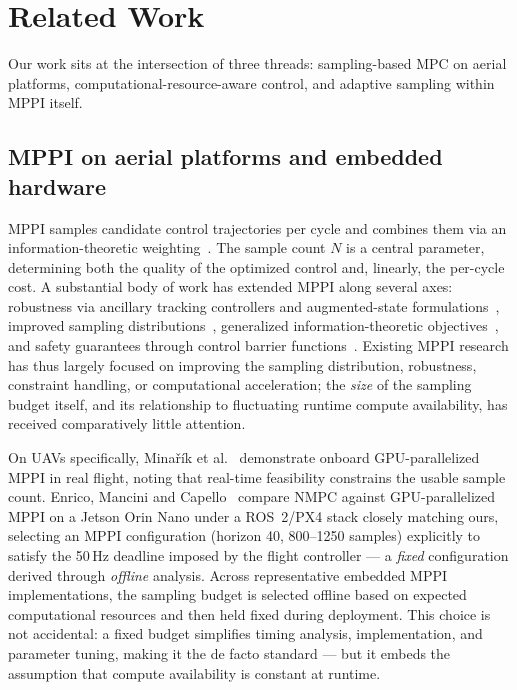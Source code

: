 \documentclass[conference]{IEEEtran}
\begin{document}
\section{Related Work}
\label{sec:related}

Our work sits at the intersection of three threads: sampling-based MPC on
aerial platforms, computational-resource-aware control, and adaptive
sampling within MPPI itself.

\subsection{MPPI on aerial platforms and embedded hardware}

MPPI samples candidate control trajectories per cycle and combines them
via an information-theoretic
weighting~\cite{williams2016aggressive,williams2018information}. The
sample count $N$ is a central parameter, determining both the quality of
the optimized control and, linearly, the per-cycle cost. A substantial
body of work has extended MPPI along several axes: robustness via
ancillary tracking controllers and augmented-state
formulations~\cite{williams2018robust,gandhi2021robust}, improved
sampling distributions~\cite{mohamed2022logmppi}, generalized
information-theoretic objectives~\cite{wang2021tsallis}, and safety
guarantees through control barrier functions~\cite{yin2023shield}.
Existing MPPI research has thus largely focused on improving the sampling
distribution, robustness, constraint handling, or computational
acceleration; the \emph{size} of the sampling budget itself, and its
relationship to fluctuating runtime compute availability, has received
comparatively little attention.

On UAVs specifically, Mina\v{r}\'ik et al.~\cite{minarik2024mppi}
demonstrate onboard GPU-parallelized MPPI in real flight, noting that
real-time feasibility constrains the usable sample count. Enrico, Mancini
and Capello~\cite{enrico2025comparison} compare NMPC against
GPU-parallelized MPPI on a Jetson Orin Nano under a ROS~2/PX4 stack
closely matching ours, selecting an MPPI configuration (horizon 40,
800--1250 samples) explicitly to satisfy the 50\,Hz deadline imposed by
the flight controller --- a \emph{fixed} configuration derived through
\emph{offline} analysis. Across representative embedded MPPI
implementations, the sampling budget is selected offline based on
expected computational resources and then held fixed during deployment.
This choice is not accidental: a fixed budget simplifies timing analysis,
implementation, and parameter tuning, making it the de facto standard ---
but it embeds the assumption that compute availability is constant at
runtime.
\end{document}

